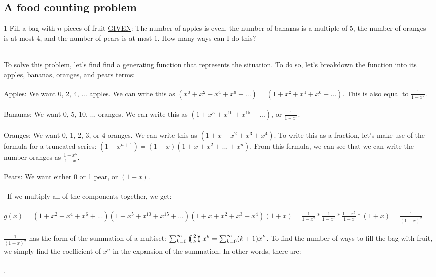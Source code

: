 \subsection*{A food counting problem}
\begin{problem}1 Fill a bag with $n$ pieces of fruit \underline{GIVEN}: The number of apples is even, the number of bananas is a multiple of 5, the number of oranges is at most 4, and the number of pears is at most 1. How many ways can I do this? \end{problem}
\begin{solution}
\\To solve this problem, let's find find a generating function that represents the situation. To do so, let's breakdown the function into its apples, bananas, oranges, and pears terms:\\ \\
Apples: We want 0, 2, 4, ... apples. We can write this as $(x^0 + x^2 + x^4 + x^6 +...) = (1 + x^2 + x^4 + x^6 +...)$. This is also equal to $\frac{1}{1-x^2}$.\\\\
Bananas: We want 0, 5, 10, ... oranges. We can write this as $(1 + x^5 + x^10 + x^15 +...)$, or $\frac{1}{1-x^5}$.\\\\
Oranges: We want 0, 1, 2, 3, or 4 oranges. We can write this as $(1 + x + x^2 + x^3 + x^4)$. To write this as a fraction, let's make use of the formula for a truncated series: $(1-x^{n+1}) = (1-x)(1+x+x^2+...+x^n)$. From this formula, we can see that we can write the number oranges as $\frac{1-x^5}{1-x}$. \\\\
Pears: We want either 0 or 1 pear, or $(1+x)$.\\\\\
If we multiply all of the components together, we get: \\\\
$g(x) = (1 + x^2 + x^4 + x^6 +...)(1 + x^5 + x^10 + x^15 +...)(1 + x + x^2 + x^3 + x^4)(1+x) = \frac{1}{1-x^2}*\frac{1}{1-x^5}*\frac{1-x^5}{1-x}*(1+x) = \frac{1}{(1-x)^2}$ \\\\
$\frac{1}{(1-x)^2}$ has the form of the summation of a multiset: $\sum_{k = 0}^\infty \multiset{2}{k}x^k = \sum_{k = 0}^\infty (k+1)x^k$. To find the number of ways to fill the bag with fruit, we simply find the coefficient of $x^n$ in the expansion of the summation. In other words, there are:\\\\
\framebox{$(n+1)$ ways}.

\end{solution}

